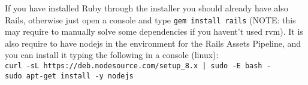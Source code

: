 If you have installed Ruby through the installer you should already have also Rails, otherwise just open a console and type \verb;gem install rails; (NOTE: this may require to manually solve some dependencies if you havent't used rvm).
It is also require to have nodejs in the environment for the Rails Assets Pipeline, and you can install it typing the following in a console (linux): \\
\verb;curl -sL https://deb.nodesource.com/setup_8.x | sudo -E bash -; \\
\verb;sudo apt-get install -y nodejs;